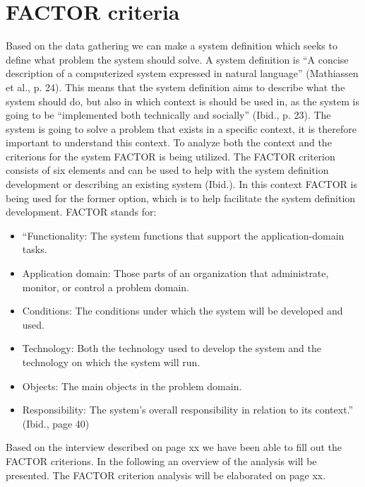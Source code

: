 \section{FACTOR criteria}

Based on the data gathering we can make a system definition which seeks to define what problem the system should solve. A system definition is “A concise description of a computerized system expressed in natural language” (Mathiassen et al., p. 24). This means that the system definition aims to describe what the system should do, but also in which context is should be used in, as the system is going to be “implemented both technically and socially” (Ibid., p. 23). The system is going to solve a problem that exists in a specific context, it is therefore important to understand this context.
To analyze both the context and the criterions for the system FACTOR is being utilized. The FACTOR criterion consists of six elements and can be used to help with the system definition development or describing an existing system (Ibid.). In this context FACTOR is being used for the former option, which is to help facilitate the system definition development. FACTOR stands for:

\begin{itemize}
\item “Functionality: The system functions that support the application-domain tasks.

\item Application domain: Those parts of an organization that administrate, monitor, or control a problem domain.

\item Conditions: The conditions under which the system will be developed and used.

\item Technology: Both the technology used to develop the system and the technology on which the system will run.

\item Objects: The main objects in the problem domain.

\item Responsibility: The system’s overall responsibility in relation to its context.” (Ibid., page 40)
\end{itemize}

Based on the interview described on page xx we have been able to fill out the FACTOR criterions. In the following an overview of the analysis will be presented. The FACTOR criterion analysis will be elaborated on page xx.

